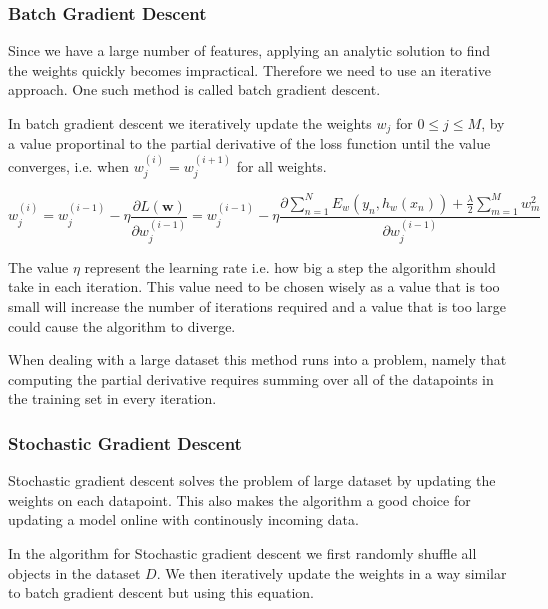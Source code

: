 \subsubsection{Batch Gradient Descent}\label{sec:batch}

Since we have a large number of features, applying an analytic solution to find the weights quickly becomes impractical.
Therefore we need to use an iterative approach.
One such method is called batch gradient descent.

In batch gradient descent we iteratively update the weights $w_j$ for $0 \leq j \leq M$, by a value proportinal to the partial derivative of the loss function until the value converges, i.e. when $w_{j}^{(i)} = w_j^{(i+1)}$ for all weights.


\[ w_j^{(i)} = w_j^{(i-1)} - \eta \frac{\partial L(\textbf{w})}{\partial w_j^{(i-1)}}
       = w_{j}^{(i-1)} - \eta \frac{\partial \sum_{n=1}^N E_w(y_n, h_w(x_n)) + \frac{\lambda}{2}\sum_{m=1}^M w_m^2}{\partial w_j^{(i-1)}} \]  

The value $\eta$ represent the learning rate i.e. how big a step the algorithm should take in each iteration.
This value need to be chosen wisely as a value that is too small will increase the number of iterations required and a value that is too large could cause the algorithm to diverge.

When dealing with a large dataset this method runs into a problem, namely that computing the partial derivative requires summing over all of the datapoints in the training set in every iteration. 

\subsubsection{Stochastic Gradient Descent}\label{sec:stochastic}

Stochastic gradient descent solves the problem of large dataset by updating the weights on each datapoint.
This also makes the algorithm a good choice for updating a model online with continously incoming data. 

In the algorithm for Stochastic gradient descent we first randomly shuffle all objects in the dataset $D$.
We then iteratively update the weights in a way similar to batch gradient descent but using this equation.

